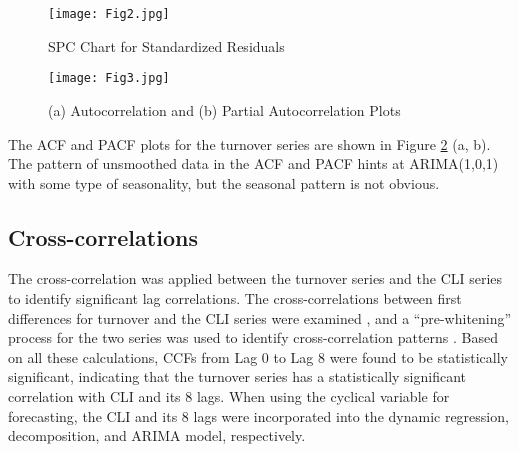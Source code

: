 \begin{figure}
	\centering
	\texttt{[image: Fig2.jpg]}
	\caption{SPC Chart for Standardized Residuals}
	\label{fig:2}
\end{figure}


\begin{figure}[h!]
	\centering
	\texttt{[image: Fig3.jpg]}
	\caption{(a) Autocorrelation and (b) Partial Autocorrelation Plots}
	\label{fig:3}
\end{figure}

The ACF and PACF plots for the turnover series are shown in Figure \ref{fig:3} (a, b). The pattern of unsmoothed data in the ACF and PACF hints at ARIMA(1,0,1) with some type of seasonality, but the seasonal pattern is not obvious.

\subsection{Cross-correlations}
The cross-correlation was applied between the turnover series and the CLI series to identify significant lag correlations. The cross-correlations between first differences  for turnover and the CLI series were examined \citep{de1998}, and a “pre-whitening” process for the two series was used to identify cross-correlation patterns \citep{box1970, bowie1981}.
Based on all these calculations, CCFs from Lag 0 to Lag 8 were found to be statistically significant, indicating that the turnover series has a statistically significant correlation with CLI and its 8 lags.  When using the cyclical variable for forecasting, the CLI and its 8 lags were incorporated into the dynamic regression, decomposition, and ARIMA model, respectively.  


